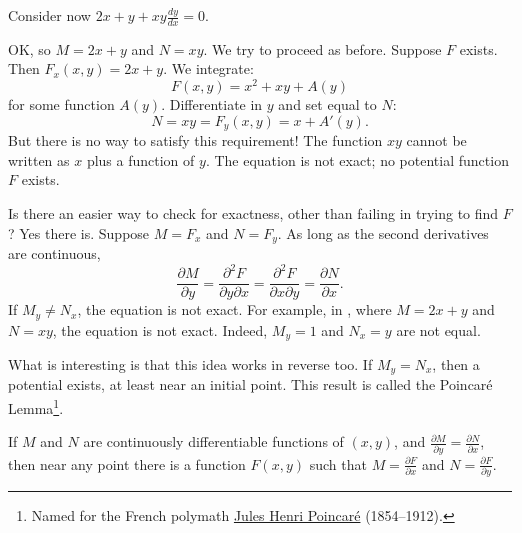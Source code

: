 \begin{example} \label{exact:example:2xyandxy}
Consider now $2x+y + xy \frac{dy}{dx} = 0$.

OK\@, so $M = 2x+y$ and $N=xy$.  We try to proceed as before.
Suppose 
$F$ exists.  Then $F_x (x,y) = 2x+y$.
We integrate:
\begin{equation*}
F(x,y) = x^2 + xy + A(y)
\end{equation*}
for some function $A(y)$.  Differentiate in $y$ and set equal to $N$:
\begin{equation*}
N = xy = F_y (x,y) = x+A'(y) .
\end{equation*}
But there is no way to satisfy this requirement!  The function $xy$ cannot
be written as $x$ plus a function of $y$.  The equation is not
exact; no potential function $F$ exists.
\end{example}

Is there an easier way to check for exactness, other than failing
in trying to find $F$?
Yes there is.  Suppose
$M = F_x$ and
$N = F_y$.
As long as the second derivatives are continuous,
\begin{equation*}
\frac{\partial M}{\partial y}
=
\frac{\partial^2 F}{\partial y \partial x}
=
\frac{\partial^2 F}{\partial x \partial y}
=
\frac{\partial N}{\partial x} .
\end{equation*}
If $M_y \not= N_x$, the equation is not exact.
For example,
in ,
where $M = 2x + y$ and $N = xy$,
the equation is not exact.
Indeed,
$M_y = 1$ and $N_x = y$ are not equal.

What is interesting is that this idea works in reverse too.
If $M_y=N_x$, then a potential exists, at least near an initial point.
This result is called the Poincar\'e Lemma\footnote{Named for the French polymath
\href{https://en.wikipedia.org/wiki/Henri_Poincar\%C3\%A9}{Jules Henri
Poincar\'e} (1854--1912).}.

\begin{theorem}
If $M$ and $N$ are continuously differentiable functions of $(x,y)$, and
$\frac{\partial M}{\partial y} = \frac{\partial N}{\partial x}$,
then near any point there is a function $F(x,y)$
such that
$M = \frac{\partial F}{\partial x}$ and
$N = \frac{\partial F}{\partial y}$.
\end{theorem}

